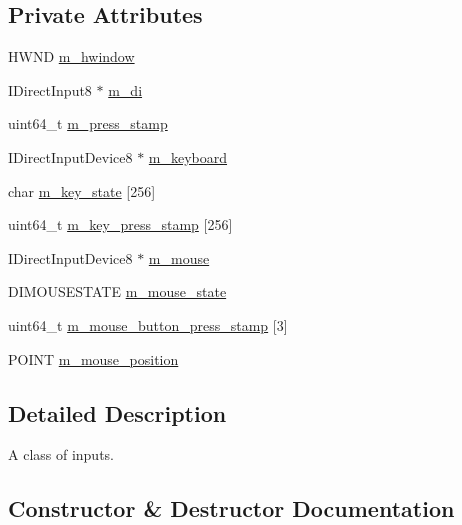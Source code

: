 \subsection*{Private Attributes}
\begin{DoxyCompactItemize}
\item 
H\+W\+ND \hyperlink{classmage_1_1_input_a1b33f0e27c18870391633b1883c3f615}{m\+\_\+hwindow}
\item 
I\+Direct\+Input8 $\ast$ \hyperlink{classmage_1_1_input_a6169d17f5a782039c7aefd0ffc5ba1bf}{m\+\_\+di}
\item 
uint64\+\_\+t \hyperlink{classmage_1_1_input_a30ac0d05616daa4211b59d680fae6d76}{m\+\_\+press\+\_\+stamp}
\item 
I\+Direct\+Input\+Device8 $\ast$ \hyperlink{classmage_1_1_input_a18ffc2becd62b77e9c4830e92cdf9999}{m\+\_\+keyboard}
\item 
char \hyperlink{classmage_1_1_input_aa0f92d1f06d3f952611ccdb69c9da1d4}{m\+\_\+key\+\_\+state} \mbox{[}256\mbox{]}
\item 
uint64\+\_\+t \hyperlink{classmage_1_1_input_a383109c45d2a0b0edeb482de8b53d53b}{m\+\_\+key\+\_\+press\+\_\+stamp} \mbox{[}256\mbox{]}
\item 
I\+Direct\+Input\+Device8 $\ast$ \hyperlink{classmage_1_1_input_ab62252cea073f7f0fae71ad4cb76a288}{m\+\_\+mouse}
\item 
D\+I\+M\+O\+U\+S\+E\+S\+T\+A\+TE \hyperlink{classmage_1_1_input_a14b8cf407e86724f900d2c4385461cfc}{m\+\_\+mouse\+\_\+state}
\item 
uint64\+\_\+t \hyperlink{classmage_1_1_input_accf558cd7da26ec27b24fde21627a07e}{m\+\_\+mouse\+\_\+button\+\_\+press\+\_\+stamp} \mbox{[}3\mbox{]}
\item 
P\+O\+I\+NT \hyperlink{classmage_1_1_input_a28b8ec250a8d0d0efe0da713060b8599}{m\+\_\+mouse\+\_\+position}
\end{DoxyCompactItemize}


\subsection{Detailed Description}
A class of inputs. 

\subsection{Constructor \& Destructor Documentation}
\hypertarget{classmage_1_1_input_a036b38f787b45d14ff92f360303b33af}{}\label{classmage_1_1_input_a036b38f787b45d14ff92f360303b33af} 
